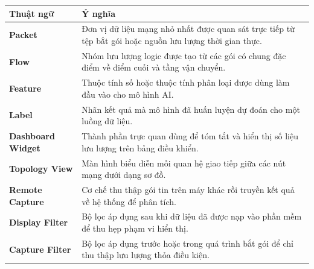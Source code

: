 \documentclass[../DoAn.tex]{subfiles}
\begin{document}
\begin{longtable}{l p{14cm}}
\hline
\textbf{Thuật ngữ} & \textbf{Ý nghĩa} \\ \hline
\textbf{Packet} & Đơn vị dữ liệu mạng nhỏ nhất được quan sát trực tiếp từ tệp bắt gói hoặc nguồn lưu lượng thời gian thực. \\ \hline
\textbf{Flow} & Nhóm lưu lượng logic được tạo từ các gói có chung đặc điểm về điểm cuối và tầng vận chuyển. \\ \hline
\textbf{Feature} & Thuộc tính số hoặc thuộc tính phân loại được dùng làm đầu vào cho mô hình AI. \\ \hline
\textbf{Label} & Nhãn kết quả mà mô hình đã huấn luyện dự đoán cho một luồng dữ liệu. \\ \hline
\textbf{Dashboard Widget} & Thành phần trực quan dùng để tóm tắt và hiển thị số liệu lưu lượng trên bảng điều khiển. \\ \hline
\textbf{Topology View} & Màn hình biểu diễn mối quan hệ giao tiếp giữa các nút mạng dưới dạng sơ đồ. \\ \hline
\textbf{Remote Capture} & Cơ chế thu thập gói tin trên máy khác rồi truyền kết quả về hệ thống để phân tích. \\ \hline
\textbf{Display Filter} & Bộ lọc áp dụng sau khi dữ liệu đã được nạp vào phần mềm để thu hẹp phạm vi hiển thị. \\ \hline
\textbf{Capture Filter} & Bộ lọc áp dụng trước hoặc trong quá trình bắt gói để chỉ thu thập lưu lượng thỏa điều kiện. \\ \hline
\end{longtable}
\end{document}
